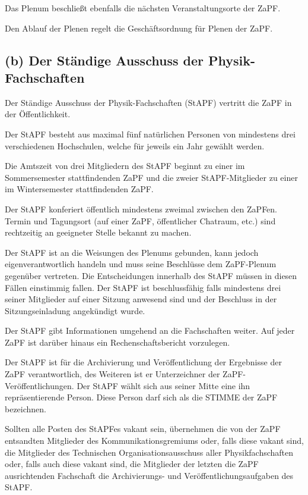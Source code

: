 \documentclass[12pt,oneside]{scrartcl}
\begin{document}
Das Plenum beschließt ebenfalls die nächsten Veranstaltungsorte der ZaPF.

Den Ablauf der Plenen regelt die Geschäftsordnung für Plenen der ZaPF.


\subsection{(b) Der Ständige Ausschuss der Physik-Fachschaften%
  \label{b-der-standige-ausschuss-der-physik-fachschaften}%
}

Der Ständige Ausschuss der Physik-Fachschaften (StAPF) vertritt die ZaPF in der
Öffentlichkeit.

Der StAPF besteht aus maximal fünf natürlichen Personen von mindestens drei
verschiedenen Hochschulen, welche für jeweils ein Jahr gewählt werden.

Die Amtszeit von drei Mitgliedern des StAPF beginnt zu einer im Sommersemester
stattfindenden ZaPF und die zweier StAPF-Mitglieder zu einer im Wintersemester
stattfindenden ZaPF.

Der StAPF konferiert öffentlich mindestens zweimal zwischen den ZaPFen.
Termin und Tagungsort (auf einer ZaPF, öffentlicher Chatraum, etc.) sind
rechtzeitig an geeigneter Stelle bekannt zu machen.

Der StAPF ist an die Weisungen des Plenums gebunden, kann jedoch
eigenverantwortlich handeln und muss seine Beschlüsse dem ZaPF-Plenum gegenüber
vertreten.
Die Entscheidungen innerhalb des StAPF müssen in diesen Fällen einstimmig fallen.
Der StAPF ist beschlussfähig falls mindestens drei seiner Mitglieder auf einer
Sitzung anwesend sind und der Beschluss in der Sitzungseinladung angekündigt
wurde.

Der StAPF gibt Informationen umgehend an die Fachschaften weiter.
Auf jeder ZaPF ist darüber hinaus ein Rechenschaftsbericht vorzulegen.

Der StAPF ist für die Archivierung und Veröffentlichung der Ergebnisse der ZaPF
verantwortlich, des Weiteren ist er Unterzeichner der ZaPF-Veröffentlichungen.
Der StAPF wählt sich aus seiner Mitte eine ihn repräsentierende Person. Diese
Person darf sich als die \textquotedbl{}STIMME der ZaPF\textquotedbl{} bezeichnen.

Sollten alle Posten des StAPFes vakant sein, übernehmen die von der ZaPF
entsandten Mitglieder des Kommunikationsgremiums oder, falls diese vakant sind,
die Mitglieder des Technischen Organisationsausschuss aller Physikfachschaften
oder, falls auch diese vakant sind, die Mitglieder der letzten die ZaPF
ausrichtenden Fachschaft die Archivierungs- und Veröffentlichungsaufgaben des
StAPF.
\end{document}
